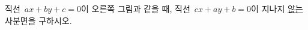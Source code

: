 \noindent\begin{minipage}[t]{0.58\linewidth}\vspace{0pt}\raggedright 직선~$ax+by+c=0$이 오른쪽 그림과 같을 때, 직선~$cx+ay+b=0$이 지나지 \underline{않는} 사분면을 구하시오. \end{minipage}\hfill\begin{minipage}[t]{0.4\linewidth}\vspace{0pt}\centering \resizebox{\ifdim\width>\linewidth\linewidth\else\width\fi}{!}{}\end{minipage}\par
